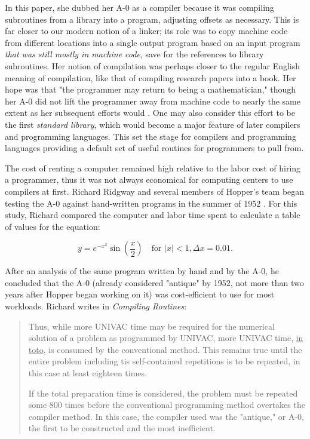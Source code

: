In this paper, she dubbed her A-0 as a compiler because it was compiling subroutines from a
library into a program, adjusting offsets as necessary. This is far closer to
our modern notion of a linker; its role was to copy machine code from different
locations into a single output program based on an input program \textit{that
was still mostly in machine code}, save for the references to library
subroutines. Her notion of compilation was perhaps closer to the regular
English meaning of compilation, like that of compiling research papers into a
book. Her hope was that "the programmer may return to being a mathematician,"
though her A-0 did not lift the programmer away from machine code to nearly the
same extent as her subsequent efforts would
\cite{education_of_a_computer_1952_hopper}. 
One may also consider this effort
to be the first \textit{standard library}, which would become a major feature
of later compilers and programming languages. This set the stage for compilers
and programming languages providing a default set of useful routines for
programmers to pull from.

The cost of renting a computer remained high relative to the labor cost of
hiring a programmer, thus it was not always economical for computing centers to
use compilers at first. Richard Ridgway and several members of Hopper's team
began testing the A-0 against hand-written programs in the summer of 1952
\cite{ridgway_compiling_routines_1952}. For this study, Richard compared the
computer and labor time spent to calculate a table of values for the equation:

\[
y = e^{-x^2} \sin\left(\frac{x}{2}\right)
\quad \text{for } |x| < 1, \Delta x = 0.01.
\]

After an analysis of the same program written by hand and by the A-0, he
concluded that the A-0 (already considered "antique" by 1952, not more than two years
after Hopper began working on it) was cost-efficient to use for most workloads.
Richard writes in \textit{Compiling Routines}\cite{ridgway_compiling_routines_1952}:

\begin{quotation}
Thus, while more UNIVAC time may be required for the numerical solution of a 
problem as programmed by UNIVAC, more UNIVAC time, \underline{in toto}, is 
consumed by the conventional method. This remains true until the entire problem 
including tis self-contained repetitions is to be repeated, in this case at 
least eighteen times.

If the total preparation time is considered, the problem must be repeated some 
800 times before the conventional programming method overtakes the compiler 
method. In this case, the compiler used was the "antique," or A-0, the first to 
be constructed and the most inefficient.
\end{quotation}

